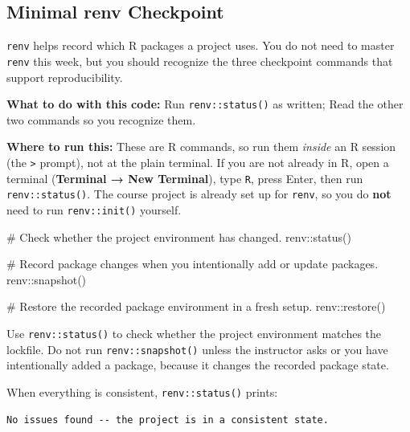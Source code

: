 \documentclass[
  letterpaper,
  DIV=11,
  numbers=noendperiod,
  oneside]{scrreprt}
\newenvironment{Shaded}{\begin{snugshade}}{\end{snugshade}}
\newcommand{\CommentTok}[1]{\textcolor[rgb]{0.37,0.37,0.37}{#1}}
\newcommand{\FunctionTok}[1]{\textcolor[rgb]{0.28,0.35,0.67}{#1}}
\newcommand{\NormalTok}[1]{\textcolor[rgb]{0.00,0.23,0.31}{#1}}
\newcommand{\SpecialCharTok}[1]{\textcolor[rgb]{0.37,0.37,0.37}{#1}}
\begin{document}
\subsection*{Minimal renv Checkpoint}\label{minimal-renv-checkpoint}

\texttt{renv} helps record which R packages a project uses. You do not
need to master \texttt{renv} this week, but you should recognize the
three checkpoint commands that support reproducibility.

\textbf{What to do with this code:} Run \texttt{renv::status()} as
written; Read the other two commands so you recognize them.

\textbf{Where to run this:} These are R commands, so run them
\emph{inside} an R session (the \texttt{\textgreater{}} prompt), not at
the plain terminal. If you are not already in R, open a terminal
(\textbf{Terminal → New Terminal}), type \texttt{R}, press Enter, then
run \texttt{renv::status()}. The course project is already set up for
\texttt{renv}, so you do \textbf{not} need to run \texttt{renv::init()}
yourself.

\begin{Shaded}
\begin{Highlighting}[numbers=left,,]
\CommentTok{\# Check whether the project environment has changed.}
\NormalTok{renv}\SpecialCharTok{::}\FunctionTok{status}\NormalTok{()}

\CommentTok{\# Record package changes when you intentionally add or update packages.}
\NormalTok{renv}\SpecialCharTok{::}\FunctionTok{snapshot}\NormalTok{()}

\CommentTok{\# Restore the recorded package environment in a fresh setup.}
\NormalTok{renv}\SpecialCharTok{::}\FunctionTok{restore}\NormalTok{()}
\end{Highlighting}
\end{Shaded}

Use \texttt{renv::status()} to check whether the project environment
matches the lockfile. Do not run \texttt{renv::snapshot()} unless the
instructor asks or you have intentionally added a package, because it
changes the recorded package state.

When everything is consistent, \texttt{renv::status()} prints:

\begin{verbatim}
No issues found -- the project is in a consistent state.
\end{verbatim}
\end{document}
